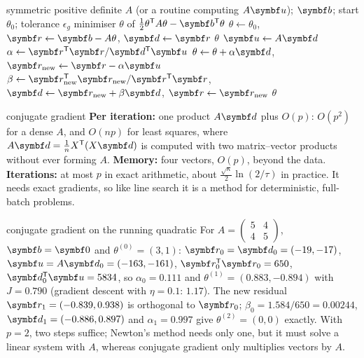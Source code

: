 \documentclass[11pt]{article}
\begin{document}
\begin{algorithm}[H]
\caption{Linear conjugate gradient for $A\theta = \vect{b}$}\label{alg:cg}
\begin{algorithmic}[1]
\Require symmetric positive definite $A$ (or a routine computing $A\vect{u}$); $\vect{b}$; start $\theta_0$; tolerance $\epsilon_g$
\Ensure minimiser $\theta$ of $\frac12\theta\T A\theta - \vect{b}\T\theta$
  \State $\theta \gets \theta_0$, \quad $\vect{r} \gets \vect{b} - A\theta$, \quad $\vect{d} \gets \vect{r}$
     \Return $\theta$ \EndIf
    \State $\vect{u} \gets A\vect{d}$ 
    \State $\alpha \gets \vect{r}\T\vect{r}/\vect{d}\T\vect{u}$ 
    \State $\theta \gets \theta + \alpha\vect{d}$, \quad $\vect{r}_{\text{new}} \gets \vect{r} - \alpha\vect{u}$ 
    \State $\beta \gets \vect{r}_{\text{new}}\T\vect{r}_{\text{new}}/\vect{r}\T\vect{r}$, \quad $\vect{d} \gets \vect{r}_{\text{new}} + \beta\vect{d}$, \quad $\vect{r} \gets \vect{r}_{\text{new}}$ 
  \EndFor
  \State \Return $\theta$
\EndFunction
\end{algorithmic}
\end{algorithm}

\begin{runtime}{conjugate gradient}
\textbf{Per iteration:} one product $A\vect{d}$ plus $O(p)$: $O(p^2)$ for a dense $A$, and $O(np)$ for least squares,
where $A\vect{d} = \frac1n X\T(X\vect{d})$ is computed with two matrix--vector products without ever forming $A$.
\textbf{Memory:} four vectors, $O(p)$, beyond the data. \textbf{Iterations:} at most $p$ in exact arithmetic, about
$\frac{\sqrt\kappa}{2}\ln(2/\tau)$ in practice. It needs exact gradients, so like line search it is a method for
deterministic, full-batch problems.
\end{runtime}

\begin{worked}{conjugate gradient on the running quadratic}
For $A = \begin{pmatrix} 5 & 4 \\ 4 & 5\end{pmatrix}$, $\vect{b} = \vect{0}$ and $\theta^{(0)} = (3, 1)$:
$\vect{r}_0 = \vect{d}_0 = (-19, -17)$, $\vect{u} = A\vect{d}_0 = (-163, -161)$, $\vect{r}_0\T\vect{r}_0 = 650$,
$\vect{d}_0\T\vect{u} = 5834$, so $\alpha_0 = 0.111$ and $\theta^{(1)} = (0.883, -0.894)$ with $J = 0.790$ (gradient
descent with $\eta = 0.1$: $1.17$). The new residual $\vect{r}_1 = (-0.839, 0.938)$ is orthogonal to $\vect{r}_0$;
$\beta_0 = 1.584/650 = 0.00244$, $\vect{d}_1 = (-0.886, 0.897)$ and $\alpha_1 = 0.997$ give $\theta^{(2)} = (0, 0)$
exactly. With $p = 2$, two steps suffice; Newton's method needs only one, but it must solve a linear system with $A$, whereas conjugate gradient only multiplies vectors by $A$.
\end{worked}
\end{document}
